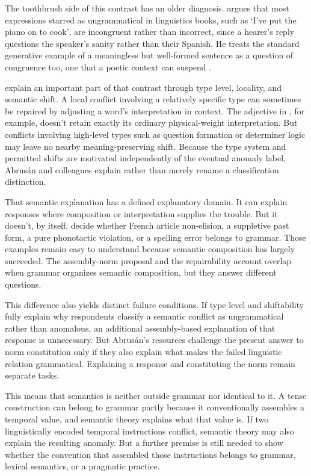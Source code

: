 \documentclass[12pt,letterpaper]{article}
\begin{document}
The toothbrush side of this contrast has an older diagnosis.
\textcite[37]{coseriu2019} argues that most expressions starred as ungrammatical
in linguistics books, such as  `I've put the
piano on to cook', are incongruent rather than incorrect, since a hearer's reply
questions the speaker's sanity rather than their Spanish. He treats the standard
generative example of a meaningless but well-formed sentence as a question of
congruence too, one that a poetic context can suspend
\citep[p.~101, n.~77]{coseriu2019}.

\textcite[250--251, 263, 268--270]{abrusanetal2021shift} explain an important part
of that contrast through type level, locality, and semantic shift. A local conflict involving a relatively
specific type can sometimes be repaired by adjusting a word's interpretation in
context. The adjective in , for example, doesn't retain
exactly its ordinary physical-weight interpretation. But conflicts involving
high-level types such as question formation or determiner logic may leave no
nearby meaning-preserving shift. Because the type system and permitted
shifts are motivated independently of the eventual anomaly label, Abrus\'an and
colleagues explain rather than merely rename a classification distinction.

That semantic explanation has a defined explanatory domain. It can explain
responses where
composition or interpretation supplies the trouble. But it doesn't, by itself,
decide whether French article non-elision, a suppletive past form, a pure
phonotactic violation, or a spelling error belongs to grammar. Those examples
remain easy to understand because semantic composition has largely succeeded.
The assembly-norm proposal and the repairability account overlap when grammar
organizes semantic composition, but they answer different questions.

This difference also yields distinct failure conditions. If type level and
shiftability fully explain why respondents classify a semantic conflict as
ungrammatical rather than anomalous, an additional assembly-based explanation of
that response is unnecessary. But Abrus\'an's resources challenge the present
answer to norm constitution only if they also explain what makes the failed
linguistic relation grammatical. Explaining a response and constituting the norm
remain separate tasks.

This means that semantics is neither outside grammar nor identical to it. A tense
construction can belong to grammar partly because it conventionally assembles a
temporal value, and semantic theory explains what that value is. If two
linguistically encoded temporal instructions conflict, semantic theory may also
explain the resulting anomaly. But a further premise is still needed to show
whether the convention that assembled those instructions belongs to grammar,
lexical semantics, or a pragmatic practice.
\end{document}
